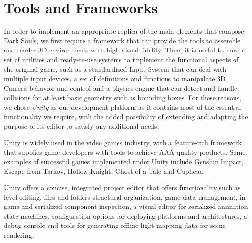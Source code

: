 \section{Tools and Frameworks}


In order to implement an appropriate replica of the main elements that compose Dark Souls, we first require a framework that can provide the tools to assemble and render 3D environments with high visual fidelity. Then, it is useful to have a set of utilities and ready-to-use systems to implement the functional aspects of the original game, such as a standardized Input System that can deal with multiple input devices, a set of definitions and functions to manipulate 3D Camera behavior and control and a physics engine that can detect and handle collisions for at least basic geometry such as bounding boxes. For these reasons, we chose \emph{Unity} as our development platform as it contains most of the essential functionality we require, with the added possibility of extending and adapting the purpose of its editor to satisfy any additional needs.


Unity is widely used in the video games industry, with a feature-rich framework that supplies game developers with tools to achieve AAA quality products. Some examples of successful games implemented under Unity include Genshin Impact, Escape from Tarkov, Hollow Knight, Ghost of a Tale and Cuphead.

Unity offers a concise, integrated project editor that offers functionality such as level editing, files and folders structural organization, game data management, in-game and serialized component inspection, a visual editor for serialized animation state machines, configuration options for deploying platforms and architectures, a debug console and tools for generating offline light mapping data for scene rendering.


